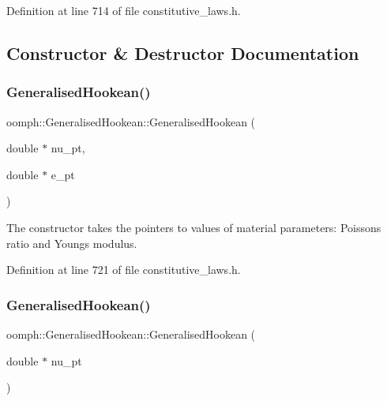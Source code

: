 Definition at line 714 of file constitutive\+\_\+laws.\+h.



\subsection{Constructor \& Destructor Documentation}
\mbox{\label{classoomph_1_1GeneralisedHookean_ae345f3619a2826b4547f7cb42a052ca6}} 
\subsubsection{\texorpdfstring{Generalised\+Hookean()}{GeneralisedHookean()}\hspace{0.1cm}{\footnotesize\ttfamily [1/2]}}
{\footnotesize\ttfamily oomph\+::\+Generalised\+Hookean\+::\+Generalised\+Hookean (\begin{DoxyParamCaption}\item[{double $\ast$}]{nu\+\_\+pt,  }\item[{double $\ast$}]{e\+\_\+pt }\end{DoxyParamCaption})\hspace{0.3cm}{\ttfamily [inline]}}

The constructor takes the pointers to values of material parameters\+: Poisson\textquotesingle{}s ratio and Young\textquotesingle{}s modulus. 

Definition at line 721 of file constitutive\+\_\+laws.\+h.

\mbox{\label{classoomph_1_1GeneralisedHookean_a470dde76fd6603da69bf4b6f12c50917}} 
\subsubsection{\texorpdfstring{Generalised\+Hookean()}{GeneralisedHookean()}\hspace{0.1cm}{\footnotesize\ttfamily [2/2]}}
{\footnotesize\ttfamily oomph\+::\+Generalised\+Hookean\+::\+Generalised\+Hookean (\begin{DoxyParamCaption}\item[{double $\ast$}]{nu\+\_\+pt }\end{DoxyParamCaption})\hspace{0.3cm}{\ttfamily [inline]}}

